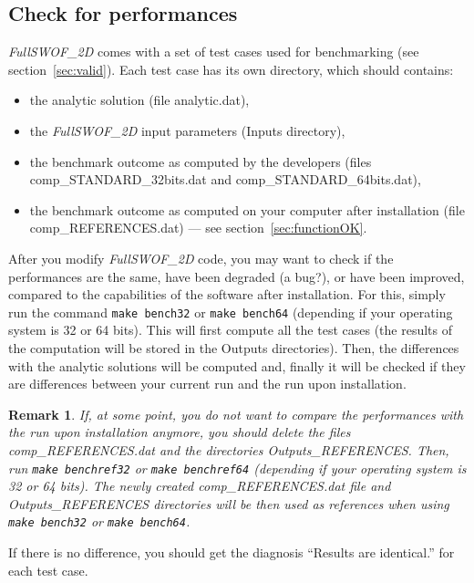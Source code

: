 \documentclass[a4paper, 11pt]{article}
\newcommand{\FullSWOF}{\emph{FullSWOF\_2D}}
\newtheorem{rmk}{Remark}
\begin{document}
\subsection{Check for performances}

\sloppy
\FullSWOF{} comes with a set of test cases used for benchmarking (see section~\ref{sec:valid}). Each test case has its own directory, which should contains:
\begin{itemize}
\item the analytic solution (file analytic.dat),
\item the \FullSWOF{} input parameters (Inputs directory),
\item the benchmark outcome as computed by the developers (files comp\_STANDARD\_32bits.dat and comp\_STANDARD\_64bits.dat),
\item the benchmark outcome as computed on your computer after installation (file comp\_REFERENCES.dat) --- see section~\ref{sec:functionOK}.
\end{itemize}

After you modify \FullSWOF{} code, you may want to check if the performances are the same, have been degraded (a bug?), or have been improved, compared to the capabilities of the software after installation. 
For this, simply run the command \verb!make bench32! or \verb!make bench64! (depending if your operating system is 32 or 64 bits).
This will first compute all the test cases (the results of the computation will be stored in the Outputs directories).
Then, the differences with the analytic solutions will be computed and, finally it will be checked if they are differences between your current run and 
the run upon installation.

\begin{rmk}
If, at some point, you do not want to compare the performances with the run upon installation anymore, you should delete the files comp\_REFERENCES.dat and the directories
Outputs\_REFERENCES. Then, run \verb!make benchref32! or \verb!make benchref64! (depending if your operating system is 32 or 64 bits).
The newly created comp\_REFERENCES.dat file and Outputs\_REFERENCES directories will be then used as references when using \verb!make bench32! or \verb!make bench64!.
\end{rmk}

If there is no difference, you should get the diagnosis ``Results are identical.'' for each test case.
\end{document}
